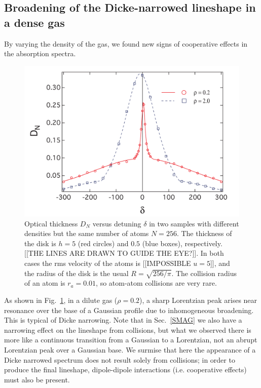 \subsection{Broadening of the Dicke-narrowed lineshape in a dense gas}

By varying the density of the gas, we found new signs of cooperative effects in the absorption spectra.

\begin{figure}[h!]
\begin{center}
\includegraphics[width=\textwidth]{DICKE.pdf}
\end{center}
\caption{Optical thickness $D_N$ versus detuning $\delta$ in two samples with different densities but the same number of atoms $N=256$. The thickness of the disk is $h=5$ (red circles) and $0.5$ (blue boxes), respectively. [[THE LINES ARE DRAWN TO GUIDE THE EYE?]]. In both cases the rms velocity of the atoms is [[IMPOSSIBLE $u=5$]], and the radius of the disk is the usual $R=\sqrt{256/\pi}$. The collision radius of an atom is $r_a=0.01$, so atom-atom collisions are very rare.}
\label{DICKE}
\end{figure}

As shown in Fig.~\ref{DICKE},  in a dilute gas ($\rho =0.2$), a sharp Lorentzian peak arises near resonance over the base of  a Gaussian profile due to inhomogeneous broadening. This is typical of Dicke narrowing. Note that in Sec.~\ref{SMAG} we also have a narrowing effect on the lineshape from collisions, but what we observed there is more like a continuous transition from a Gaussian to a Lorentzian, not an abrupt Lorentzian peak over a Gaussian base. We surmise that here the appearance of a Dicke narrowed spectrum does not result solely from collisions; in order to produce the final lineshape, dipole-dipole interactions (i.e. cooperative effects) must also be present.

